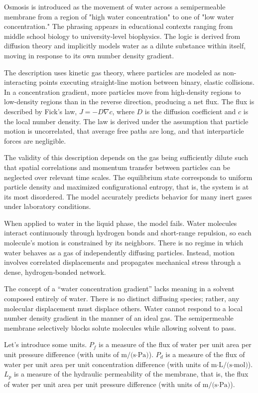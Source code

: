 Osmosis is introduced as the movement of water across a semipermeable membrane from a region of "high water concentration" to one of "low water concentration." The phrasing appears in educational contexts ranging from middle school biology to university-level biophysics. The logic is derived from diffusion theory and implicitly models water as a dilute substance within itself, moving in response to its own number density gradient.

The description uses kinetic gas theory, where particles are modeled as non-interacting points executing straight-line motion between binary, elastic collisions. In a concentration gradient, more particles move from high-density regions to low-density regions than in the reverse direction, producing a net flux. The flux is described by Fick's law, $J = -D \nabla c$, where $D$ is the diffusion coefficient and $c$ is the local number density. The law is derived under the assumption that particle motion is uncorrelated, that average free paths are long, and that interparticle forces are negligible.

The validity of this description depends on the gas being sufficiently dilute such that spatial correlations and momentum transfer between particles can be neglected over relevant time scales. The equilibrium state corresponds to uniform particle density and maximized configurational entropy, that is, the system is at its most disordered. The model accurately predicts behavior for many inert gases under laboratory conditions.

When applied to water in the liquid phase, the model fails. Water molecules interact continuously through hydrogen bonds and short-range repulsion, so each molecule's motion is constrained by its neighbors. There is no regime in which water behaves as a gas of independently diffusing particles. Instead, motion involves correlated displacements and propagates mechanical stress through a dense, hydrogen-bonded network.

The concept of a “water concentration gradient” lacks meaning in a solvent composed entirely of water. There is no distinct diffusing species; rather, any molecular displacement must displace others. Water cannot respond to a local number density gradient in the manner of an ideal gas. The semipermeable membrane selectively blocks solute molecules while allowing solvent to pass.

Let's introduce some units. $P_f$ is a measure of the flux of water per unit area per unit pressure difference (with units of $\text{m/(s·Pa)}$). $P_d$ is a measure of the flux of water per unit area per unit concentration difference (with units of $\text{m·L/(s·mol)}$). $L_p$ is a measure of the hydraulic permeability of the membrane, that is, the flux of water per unit area per unit pressure difference (with units of $\text{m/(s·Pa)}$).

